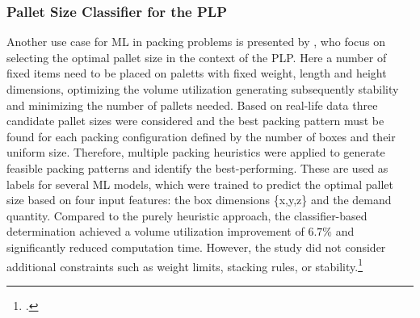 \subsubsection{Pallet Size Classifier for the \gls{PLP}}
Another use case for \gls{ML} in packing problems is presented by \textcite{aylak_application_2021},
who focus on selecting the optimal pallet size in the context of the \gls{PLP}. Here a number of fixed items
need to be placed on paletts with fixed weight, length and height dimensions, optimizing the volume utilization
generating subsequently stability and minimizing the number of pallets needed. Based on real-life data
three candidate pallet sizes were considered and the best packing pattern must be found for each packing
configuration defined by the number of boxes and their uniform size. Therefore, multiple packing heuristics were applied to
generate feasible packing patterns and identify the best-performing. These are used as labels for several
\gls{ML} models, which were trained to predict the optimal pallet size based on four input features: the box
dimensions \{x,y,z\} and the demand quantity. Compared to the purely heuristic approach, the classifier-based
determination achieved a volume utilization improvement of $6.7\%$ and significantly reduced computation time.
However, the study did not consider additional constraints such as weight limits, stacking rules, or stability.\footcite[cf.][pp. 12--14]{aylak_application_2021}

\parbreak

